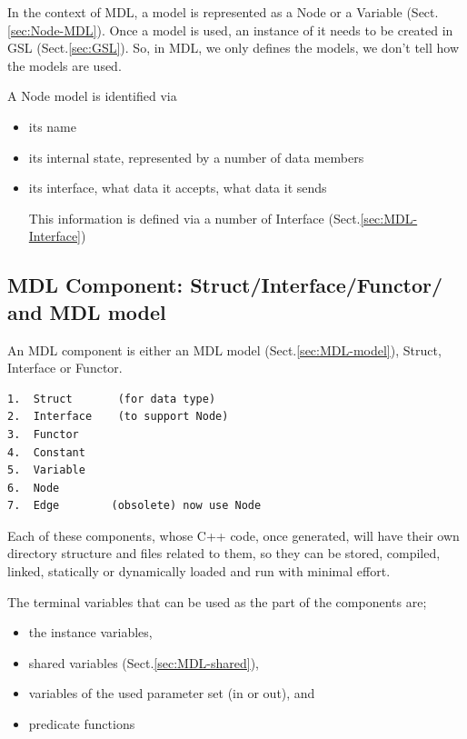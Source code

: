

In the context of MDL, a model is represented as
a Node or a Variable (Sect.\ref{sec:Node-MDL}). Once a model is used, an instance of it needs to be
created in GSL (Sect.\ref{sec:GSL}). So, in MDL, we only defines the models, we
don't tell how the models are used.

A Node model is identified via 
\begin{itemize}
  \item its name
  
  \item its internal state, represented by a number of data members
  
  \item its interface, what data it accepts, what data it sends
  
  This information is defined via a number of Interface (Sect.\ref{sec:MDL-Interface})
\end{itemize}

\subsection{MDL Component: Struct/Interface/Functor/ and MDL model}
\label{sec:MDL-component}


An MDL component is either an MDL model (Sect.\ref{sec:MDL-model}), Struct,
Interface or Functor.

\begin{verbatim}
1.	Struct       (for data type)
2.	Interface    (to support Node)
3.	Functor
4.	Constant
5.	Variable
6.	Node
7.	Edge        (obsolete) now use Node
\end{verbatim}
Each of these components, whose C++ code, once generated, will have their own
directory structure and files related to them, so they can be stored, compiled,
linked, statically or dynamically loaded and run with minimal effort.

The terminal variables that can be used as the part of the components are; 
\begin{itemize}
  \item  the instance variables, 
  
  \item shared variables (Sect.\ref{sec:MDL-shared}), 
  
  \item variables of the used parameter set (in or out), and 
  
  \item predicate functions
\end{itemize}

